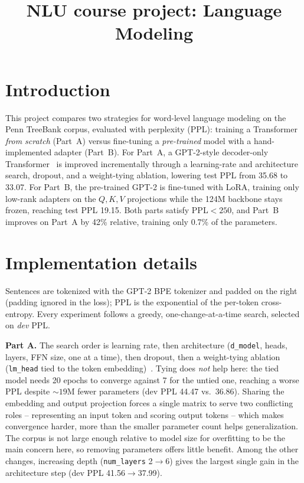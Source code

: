 \documentclass[a4paper]{article}
\title{NLU course project: Language Modeling}
\begin{document}
\maketitle

\section{Introduction}
This project compares two strategies for word-level language modeling on the
Penn TreeBank corpus, evaluated with perplexity (PPL): training a Transformer
\emph{from scratch} (Part~A) versus fine-tuning a \emph{pre-trained} model
with a hand-implemented adapter (Part~B). For Part~A, a GPT-2-style
decoder-only Transformer~\cite{vaswani2017} is improved incrementally
through a learning-rate and architecture search, dropout, and a weight-tying
ablation, lowering test PPL from 35.68 to 33.07. For Part~B, the pre-trained
GPT-2 is fine-tuned with LoRA, training only low-rank adapters on the
$Q,K,V$ projections while the 124M backbone stays frozen, reaching test PPL
19.15. Both parts satisfy PPL${<}250$, and Part~B improves on Part~A by 42\%
relative, training only 0.7\% of the parameters.

\section{Implementation details}
Sentences are tokenized with the GPT-2 BPE tokenizer and padded on the right
(padding ignored in the loss); PPL is the exponential of the per-token
cross-entropy. Every experiment follows a greedy, one-change-at-a-time
search, selected on \emph{dev} PPL.

\textbf{Part A.} The search order is learning rate, then architecture
(\texttt{d\_model}, heads, layers, FFN size, one at a time), then dropout,
then a weight-tying ablation
(\texttt{lm\_head} tied to the token embedding)~\cite{press2017}. Tying does
\emph{not} help here: the tied model needs 20 epochs to converge against 7
for the untied one, reaching a worse PPL despite ${\sim}19$M fewer parameters
(dev PPL 44.47 vs.\ 36.86). Sharing the embedding and output projection
forces a single matrix to serve two conflicting roles -- representing an
input token and scoring output tokens -- which makes convergence harder,
more than the smaller parameter count helps generalization. The corpus is
not large enough relative to model size for overfitting to be the main
concern here, so removing parameters offers little benefit. Among the other
changes, increasing depth (\texttt{num\_layers} 2$\to$6) gives the largest
single gain in the architecture step (dev PPL 41.56$\to$37.99).
\end{document}
